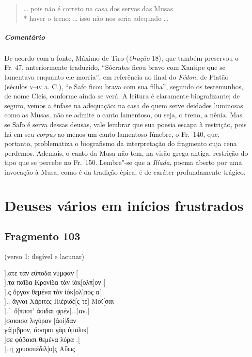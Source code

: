 {\begin{verse}
\ldots{} pois não é correto na casa dos servos das Musas\\*
haver o treno; \ldots{} isso não nos seria adequado \ldots{}
\end{verse}

{\paragraph{Comentário} De acordo com a fonte, Máximo de Tiro (\textit{Oração} 18), que também preservou o Fr.
47, anteriormente traduzido, ``Sócrates ficou bravo com Xantipe que se
lamentava enquanto ele morria”, em referência ao final do \textit{Fédon}, de
Platão (séculos \textsc{v--iv} a. C.), ``e Safo ficou brava com sua filha”, segundo os testemunhos, de
nome Cleis, conforme ainda se verá. A leitura é
claramente biografizante; de seguro, vemos a ênfase na adequação: na casa de quem serve
deidades luminosas como as Musas, não se admite o canto lamentoso, ou seja, o
treno, a nênia. Mas se Safo é serva dessas deusas, vale lembrar que sua poesia
escapa à restrição, pois há em seu \textit{corpus} ao menos um canto lamentoso
fúnebre, o Fr.~140, que, portanto, problematiza o biografismo da interpretação
do fragmento cuja cena perdemos. Ademais, o canto da Musa não tem, na visão grega antiga,
restrição do tipo que se percebe no Fr.~150. Lembre"-se que a \textit{Ilíada},
poema aberto por uma invocação à Musa, como é da tradição épica, é de caráter
profundamente trágico.}


\chapter{Deuses vários em inícios frustrados}


\section{Fragmento 103}

\begin{gkverse}
\textnormal{(verso 1: ilegível e lacunar)}

].ατε τὰν εὔποδα νύμφαν [\\[8pt]
].τ̣α παῖδα Κρονίδα τὰν ἰόκ[ολπ]ον [\\[8pt]
].ς̣ ὄργαν θεμένα τὰν ἰόκ[ολ]πος α[\\[8pt]
 ].. ἄγναι Χάριτες Πιέριδέ[ς τε] Μοῖ[σαι\\[8pt]
     ].[. ὄ]πποτ’ ἀοιδαι φρέ̣ν[...]αν.[\\[8pt]
             ]σ̣αιοισα λιγύραν [ἀοί]δαν\\[8pt]
         γά]μβρον, ἄσαροι γ̣ὰρ̣ ὐμαλικ[\\[8pt]
  ]σε φόβαισι θεμένα λύρα .[\\[8pt]
  ]..η χρυσοπέδιλ̣[ο]ς Αὔως
\end{gkverse}

}
